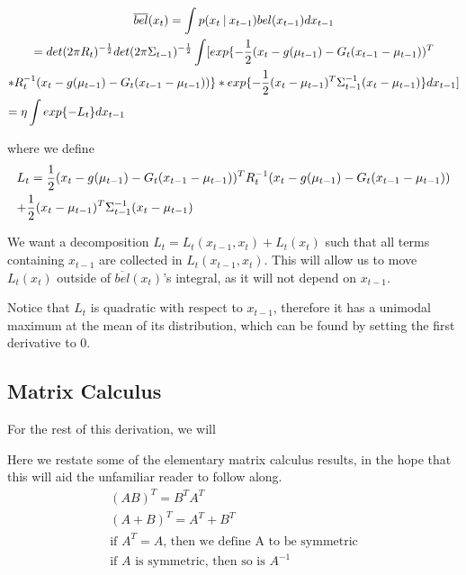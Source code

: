 \begin{multline} \label{eqBelBarLt}
\overline{bel}(x_t) = \int p(x_t \mathbin{\vert} x_{t-1}) bel(x_{t-1})dx_{t-1} \\
= det(2 \pi R_t)^{-\frac{1}{2}} det(2 \pi \Sigma_{t-1})^{-\frac{1}{2}} \int [ exp\{-\frac{1}{2} (x_t - g(\mu_{t-1}) - G_t (x_{t-1} - \mu_{t-1}))^T \\ * R_t^{-1} (x_t - g(\mu_{t-1}) - G_t (x_{t-1} - \mu_{t-1}))\} * exp \{-\frac{1}{2} (x_t - \mu_{t-1})^T \Sigma_{t-1}^{-1} (x_t - \mu_{t-1}) \}dx_{t-1} ] \\
= \eta \int exp\{-L_t\}dx_{t-1} \hfill
\end{multline}

where we define
\begin{multline}
L_t = \frac{1}{2} (x_t - g(\mu_{t-1}) - G_t (x_{t-1} - \mu_{t-1}))^T R_t^{-1} (x_t - g(\mu_{t-1}) - G_t (x_{t-1} - \mu_{t-1}))\\
+ \frac{1}{2} (x_t - \mu_{t-1})^T \Sigma_{t-1}^{-1} (x_t - \mu_{t-1}) \hfill
\end{multline}

We want a decomposition \(L_t = L_t(x_{t-1},x_t) + L_t(x_t)\) such that all terms containing \(x_{t-1}\) are collected in \(L_t(x_{t-1},x_t)\). This will allow us to move \(L_t(x_t)\) outside of \(\overline{bel}(x_t)\)'s integral, as it will not depend on \(x_{t-1}\).

Notice that \(L_t\) is quadratic with respect to \(x_{t-1}\), therefore it has a unimodal maximum at the mean of its distribution, which can be found by setting the first derivative to 0.

\subsection{Matrix Calculus}
For the rest of this derivation, we will

Here we restate some of the elementary matrix calculus results, in the hope that this will aid the unfamiliar reader to follow along.
\begin{gather*}
(AB)^T = B^T A^T \\
(A+B)^T = A^T + B^T \\
\text{if } A^T = A \text{, then we define A to be symmetric} \\
\text{if } A \text{ is symmetric, then so is } A^{-1} 
\end{gather*}

